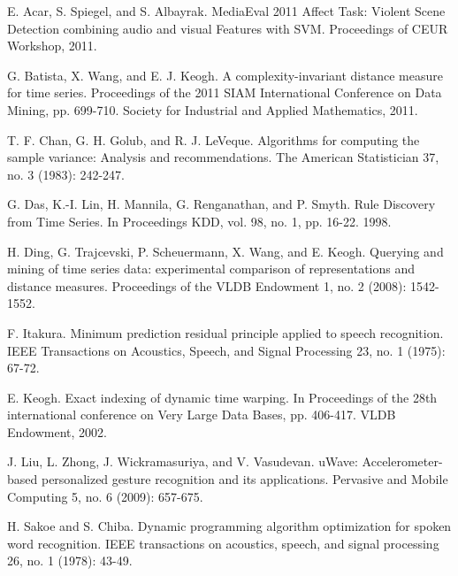 \newpage
\begin{thebibliography}{2} 
    \normalsize
    
    E. Acar, S. Spiegel, and S. Albayrak. 
    MediaEval 2011 Affect Task: Violent Scene Detection combining audio and visual Features with SVM. 
    Proceedings of CEUR Workshop, 2011.

    G. Batista, X. Wang, and E. J. Keogh. 
    A complexity-invariant distance measure for time series. 
    Proceedings of the 2011 SIAM International Conference on Data Mining, pp. 699-710. Society for Industrial and Applied Mathematics, 2011.
        
    T. F. Chan, G. H. Golub, and R. J. LeVeque. 
    Algorithms for computing the sample variance: Analysis and recommendations.
	The American Statistician 37, no. 3 (1983): 242-247.
        
    G. Das, K.-I. Lin, H. Mannila, G. Renganathan, and P. Smyth. 
    Rule Discovery from Time Series.
    In Proceedings KDD, vol. 98, no. 1, pp. 16-22. 1998.
        
    H. Ding, G. Trajcevski, P. Scheuermann, X. Wang, and E. Keogh. 
    Querying and mining of time series data: experimental comparison of representations and distance measures.
    Proceedings of the VLDB Endowment 1, no. 2 (2008): 1542-1552.
    
    F. Itakura. 
    Minimum prediction residual principle applied to speech recognition. 
    IEEE Transactions on Acoustics, Speech, and Signal Processing 23, no. 1 (1975): 67-72.

    E. Keogh. 
    Exact indexing of dynamic time warping. 
    In Proceedings of the 28th international conference on Very Large Data Bases, pp. 406-417. VLDB Endowment, 2002.

    J. Liu, L. Zhong, J. Wickramasuriya, and V. Vasudevan. 
    uWave: Accelerometer-based personalized gesture recognition and its applications. 
    Pervasive and Mobile Computing 5, no. 6 (2009): 657-675.

    H. Sakoe and S. Chiba. 
    Dynamic programming algorithm optimization for spoken word recognition.
    IEEE transactions on acoustics, speech, and signal processing 26, no. 1 (1978): 43-49.


\end{thebibliography}
